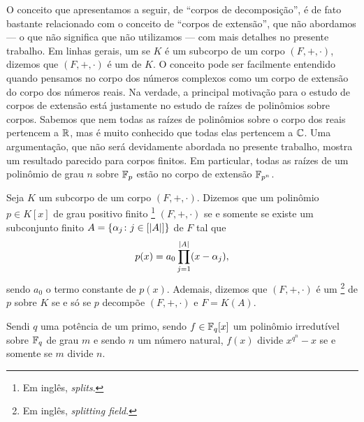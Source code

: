 O conceito que apresentamos a seguir, de ``corpos de decomposição'', é
de fato bastante relacionado com o conceito de ``corpos de extensão'',
que não abordamos --- o que não significa que não utilizamos ---
com mais detalhes no presente
trabalho. Em linhas gerais, um se $K$ é um subcorpo de um corpo
$(F,+,\cdot)$, dizemos que $(F,+,\cdot)$ é um  de $K$. O conceito pode ser facilmente entendido quando
pensamos no corpo dos números complexos como um corpo de
extensão do corpo dos números reais. Na verdade, a principal motivação
para o estudo de corpos de extensão está justamente no estudo de raízes
de polinômios sobre corpos. Sabemos que nem todas as raízes de
polinômios sobre o corpo dos reais pertencem a $\mathbb{R}$, mas é muito
conhecido que todas elas pertencem a $\mathbb{C}$. Uma argumentação, que
não será devidamente abordada no presente trabalho, mostra um resultado
parecido para corpos finitos. Em particular, todas as raízes de um
polinômio de grau $n$ sobre $\mathbb{F}_{p}$ estão no corpo de extensão
$\mathbb{F}_{p^n}$.

\begin{Def}
  Seja $K$ um subcorpo de um corpo
  $(F,+,\cdot)$.
  Dizemos que um polinômio $p\in K[x]$ de grau positivo finito
  \footnote{Em inglês,
  \textit{splits}.}
  $(F,+,\cdot)$ se e somente se existe um subconjunto finito
  $A=\left\{ \alpha_j\colon j\in[\left| A \right|] \right\}$ de $F$ tal que
  \begin{equation*}
    p(x) = a_0\prod_{j=1}^{\left| A \right|}(x-\alpha_j)\mathrm{,}
  \end{equation*}
  sendo $a_0$ o termo constante de $p(x)$. Ademais, dizemos que
  $(F,+,\cdot)$ é um \footnote{Em inglês, \textit{splitting
  field}.} de $p$ sobre $K$
  se e só se $p$ decompõe $(F,+,\cdot)$ e $F=K(A)$.
\end{Def}

\begin{Lem}
  Sendi $q$ uma potência de um primo, sendo $f\in \mathbb{F}_{q}[x]$ um
  polinômio irredutível sobre $\mathbb{F}_{q}$ de grau $m$ e sendo $n$ um
  número natural, $f(x)$ divide $x^{q^n}-x$ se e somente se $m$ divide
  $n$.
\end{Lem}

